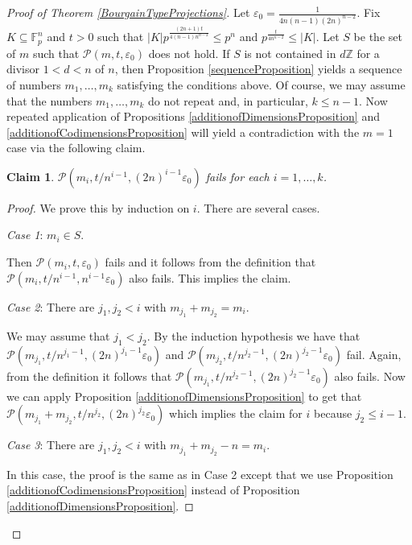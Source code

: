 \documentclass[10pt,a4paper]{amsart}
\newtheorem{claim}{Claim}
\newcommand{\F}{\mathbb F}
\begin{document}
\begin{proof}[Proof of Theorem \ref{BourgainTypeProjections}]
    Let $\varepsilon_0 = \frac{1}{4n(n - 1)(2n)^{n - 2}}$. Fix $K \subseteq \F_p^n$ and $t > 0$ such that $|K|p^{\frac{(2n + 1)t}{4(n - 1)n^{n - 2}}} \leq p^n$ and $ p^{\frac{t}{4 n^{n - 2}}} \leq |K|$. Let $S$ be the set of $m$ such that $\mathcal{P}(m, t, \varepsilon_0)$ does not hold. If $S$ is not contained in $d \mathbb{Z}$ for a divisor $1 < d < n$ of $n$, then Proposition \ref{sequenceProposition} yields a sequence of numbers $m_1, \ldots, m_k$ satisfying the conditions above. Of course, we may assume that the numbers $m_1, \ldots, m_k$ do not repeat and, in particular, $k \leq n - 1$.
    Now repeated application of Propositions \ref{additionofDimensionsProposition} and \ref{additionofCodimensionsProposition} will yield a contradiction with the $m = 1$ case via the following claim.
    \begin{claim}
        $\mathcal{P}(m_i, t/n^{i - 1}, (2n)^{i - 1}\varepsilon_0)$ fails for each $i = 1, \ldots, k$.
    \end{claim}
    
    \begin{proof}
        We prove this by induction on $i$. There are several cases.
        
        \textit{Case 1}: $m_i \in S$. 

        Then $\mathcal{P}(m_i, t, \varepsilon_0)$ fails and it follows from the definition that $\mathcal{P}(m_i, t/n^{i - 1}, n^{i - 1}\varepsilon_0)$ also fails. This implies the claim.

        \textit{Case 2}: There are $j_1, j_2 < i$ with $m_{j_1} + m_{j_2} = m_i$.

        We may assume that $j_1 < j_2$. By the induction hypothesis we have that $\mathcal{P}(m_{j_1}, t/n^{j_1 - 1}, (2n)^{j_1 - 1}\varepsilon_0)$ and $\mathcal{P}(m_{j_2}, t/n^{j_2 - 1}, (2n)^{j_2 - 1}\varepsilon_0)$ fail. Again, from the definition it follows that $\mathcal{P}(m_{j_1}, t/n^{j_2 - 1}, (2n)^{j_2 - 1}\varepsilon_0)$ also fails. Now we can apply Proposition \ref{additionofDimensionsProposition} to get that $\mathcal{P}(m_{j_1} + m_{j_2}, t/n^{j_2}, (2n)^{j_2}\varepsilon_0)$ which implies the claim for $i$ because $j_2 \leq i - 1$.

        \textit{Case 3}: There are $j_1, j_2 < i$ with $m_{j_1} + m_{j_2} - n = m_i$.

        In this case, the proof is the same as in Case 2 except that we use Proposition \ref{additionofCodimensionsProposition} instead of Proposition \ref{additionofDimensionsProposition}.
    \end{proof}
    

\end{proof}
\end{document}

